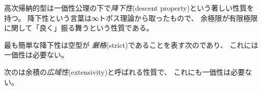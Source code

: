 \documentclass[index]{subfiles}
\begin{document}

高次帰納的型は一価性公理の下で\emph{降下性}(descent property)という著しい性質を持つ。
降下性という言葉は∞トポス理論から取ったもので、
余極限が有限極限に関して「良く」振る舞うという性質である。

最も簡単な降下性は空型\myInlineMath{\myEmptyType}が
\emph{厳格}(strict)であることを表す次のであり、
これには一価性は必要ない。



次のは余積の\emph{広域性}(extensivity)と呼ばれる性質で、
これにも一価性は必要ない。




\end{document}
